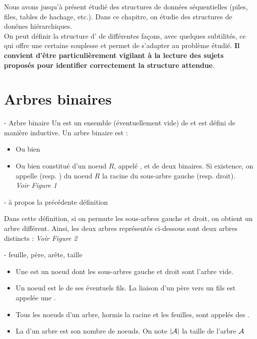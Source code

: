

Nous avons jusqu'à présent étudié des structures de données séquentielles (piles, files, tables de hachage, etc.). Dans ce chapitre, on étudie des structures de donénes hiérarchiques. \\
On peut définir la structure d' de différentes façons, avec quelques subtilités, ce qui offre une certaine souplesse et permet de s'adapter au problème étudié. \textbf{Il convient d'être particulièrement vigilant à la lecture des sujets proposés pour identifier correctement la structure attendue}.
\section{Arbres binaires}

\begin{definition}{7.1}{ - Arbre binaire}
    Un  est un ensemble (éventuellement vide) de  et est défini de manière inductive. Un arbre binaire est : \begin{itemize}
        \item Ou bien 
        \item Ou bien constitué d'un noeud $R$, appelé , et de deux  binaires. Si existence, on appelle  (resp. ) du noeud $R$ la racine du sous-arbre gauche (resp. droit). \\ \textit{Voir Figure 1}
    \end{itemize}
\end{definition}

\begin{remarque}{7.2}{ - à propos la précédente définition}
    \item Dans cette définition, si on permute les sous-arbres gauche et droit, on obtient un arbre différent. Ainsi, les deux arbres représentés ci-dessous sont deux arbres distincts : \textit{Voir Figure 2}
\end{remarque}

\begin{definition}{7.3}{ - feuille, père, arête, taille}
    \begin{itemize}
        \item Une  est un noeud dont les sous-arbres gauche et droit sont l'arbre vide.
        \item Un noeud est le  de ses éventuels fils. La liaison d'un père vers un fils est appelée une .
        \item Tous les noeuds d'un arbre, hormis la racine et les feuilles, sont appelés des .
        \item La  d'un arbre est son nombre de noeuds. On note $|\mathcal{A}|$ la taille de l'arbre $\mathcal{A}$
    \end{itemize}
\end{definition}

